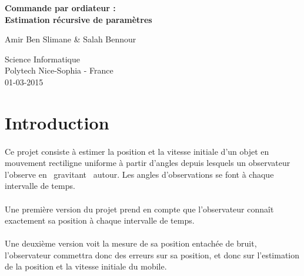 \documentclass[a4paper,11pt]{article}
\begin{document}
\begin{titlepage}
    \begin{center}
        \vspace*{1cm}
        
       	\vfill
       	\Huge
        \textbf{Commande par ordiateur :\\ Estimation récursive de paramètres}

        \vspace{0.3cm}
        \Large
		Amir Ben Slimane \& Salah Bennour         
        

		\vfill
        \vspace{0.8cm}
        

        \Large
        Science Informatique\\
        Polytech Nice-Sophia - France\\
        01-03-2015
        
    \end{center}
\end{titlepage}

	\newpage

	\tableofcontents

	\newpage

	\section{Introduction}

		\paragraph{}
		Ce projet consiste à estimer la position et la vitesse initiale d'un objet en mouvement rectiligne uniforme à partir d'angles depuis lesquels un observateur l'observe en \« gravitant \» autour.
		Les angles d'observations se font à chaque intervalle de temps. 

		\paragraph{}
		Une première version du projet prend en compte que l'observateur connaît exactement sa position à chaque intervalle de temps. 

		\paragraph{}
		Une deuxième version voit la mesure de sa position entachée de bruit, l'observateur commettra donc des erreurs sur sa position, et donc sur l'estimation de la position et la vitesse initiale du mobile.
	
\end{document}
